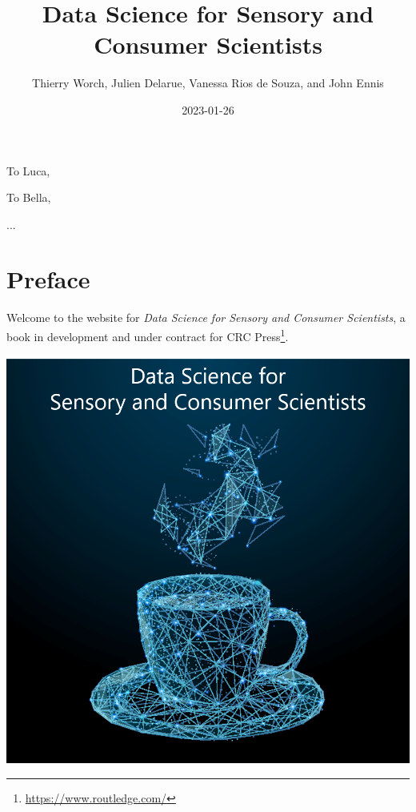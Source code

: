 \documentclass[
]{krantz}
\title{Data Science for Sensory and Consumer Scientists}
\author{Thierry Worch, Julien Delarue, Vanessa Rios de Souza, and John Ennis}
\date{2023-01-26}
\renewcommand{\href}[2]{#2\footnote{\url{#1}}}
\begin{document}
\maketitle


\thispagestyle{empty}

\begin{center}
To Luca,

To Bella,

...
\end{center}

\setlength{\abovedisplayskip}{-5pt}
\setlength{\abovedisplayshortskip}{-5pt}

{
\hypersetup{linkcolor=}
\setcounter{tocdepth}{2}
\tableofcontents
}
\hypertarget{preface}{%
\chapter*{Preface}\label{preface}}


Welcome to the website for \emph{Data Science for Sensory and Consumer Scientists}, a book in development and under contract for \href{https://www.routledge.com/}{CRC Press}.

\includegraphics[width=0.9\linewidth]{images/cover_art}
\end{document}
